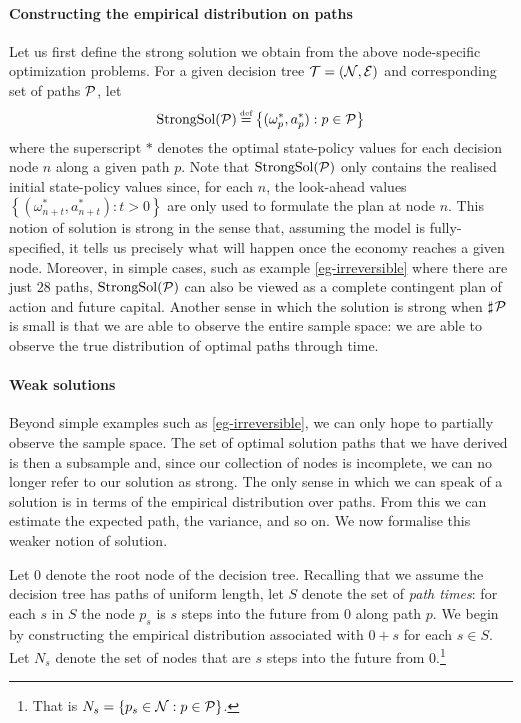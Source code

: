 \documentclass[12pt,a4paper,twoside, draft]{article}
\newcommand{\countof}{\mathbin{\sharp}\hskip1pt}
\begin{document}
\paragraph{Constructing the empirical distribution on paths}
Let us first define the strong solution we obtain from the above node-specific
optimization problems.
For a given decision tree $\mathcal T = (\mathcal N, \mathcal E)$ and corresponding set of
paths $\mathcal P$, let
\[
   \textup{StrongSol}(\mc P) \defeq \left\{
      (\omega^{*}_{p}, a^{*}_{p}) : p \in \mc P
   \right\}
\]
where the superscript $*$ denotes the optimal state-policy values
for each decision node $n$ along a given path $p$.
Note that $\textup{StrongSol}(\mathcal P)$ only contains the realised initial
state-policy values since, for each $n$, the look-ahead values
$\left\{(\omega^{*}_{n + t}, a^{*}_{n + t}) : t > 0 \right\}$ are only used to
formulate the plan at node $n$.
This notion of solution is strong in the sense that, assuming the model is
fully-specified, it tells us precisely what will happen once the economy
reaches a given node.
Moreover, in simple cases, such as example \ref{eg-irreversible} where there
are just $28$ paths, $\textup{StrongSol}(\mathcal P)$ can also be viewed as a
complete contingent plan of action and future capital.
Another sense in which the solution is strong when $\countof \mc P$
is small is that we are able to observe the entire sample space: we are able to
observe the true distribution of optimal paths through time.

\paragraph{Weak solutions}
Beyond simple examples such as \cref{eg-irreversible}, we can only hope to
partially observe the sample space.
The set of optimal solution paths that we have derived is then a subsample and,
since our collection of nodes is incomplete, we can no longer refer to our
solution as strong.
The only sense in which we can speak of a solution is in terms of the empirical
distribution over paths. 
From this we can estimate the expected path, the variance, and so on.
We now formalise this weaker notion of solution.

Let $\mathfrak{0}$ denote the root node of the decision tree.
Recalling that we assume the decision tree has paths of uniform length, let $S$
denote the set of \emph{path times}: for each $s$ in $S$ the node $p_s$ is $s$
steps into the future from $\mathfrak{0}$ along path $p$.
We begin by constructing the empirical distribution associated with
$\mathfrak{0} + s$ for each $s \in S$.
Let $N_s$ denote the set of nodes that are $s$ steps into the future from
$\mathfrak{0}$.\footnote{
   That is $N_{s} = \left\{ p_{s} \in \mathcal N : p \in \mathcal P\right\}$.
}
\end{document}
